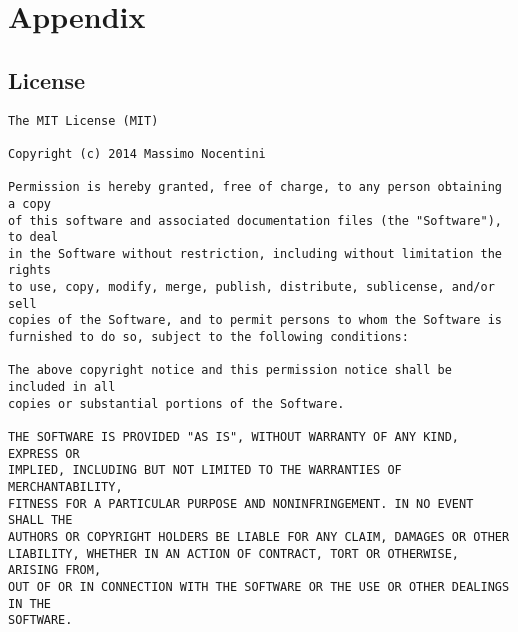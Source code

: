 \documentclass[10pt,a4paper]{article}
\begin{document}
    \newpage

    \section{Appendix}
    \label{sec:appendix}

    \subsection{License}
\begin{verbatim}
The MIT License (MIT)

Copyright (c) 2014 Massimo Nocentini

Permission is hereby granted, free of charge, to any person obtaining a copy
of this software and associated documentation files (the "Software"), to deal
in the Software without restriction, including without limitation the rights
to use, copy, modify, merge, publish, distribute, sublicense, and/or sell
copies of the Software, and to permit persons to whom the Software is
furnished to do so, subject to the following conditions:

The above copyright notice and this permission notice shall be included in all
copies or substantial portions of the Software.

THE SOFTWARE IS PROVIDED "AS IS", WITHOUT WARRANTY OF ANY KIND, EXPRESS OR
IMPLIED, INCLUDING BUT NOT LIMITED TO THE WARRANTIES OF MERCHANTABILITY,
FITNESS FOR A PARTICULAR PURPOSE AND NONINFRINGEMENT. IN NO EVENT SHALL THE
AUTHORS OR COPYRIGHT HOLDERS BE LIABLE FOR ANY CLAIM, DAMAGES OR OTHER
LIABILITY, WHETHER IN AN ACTION OF CONTRACT, TORT OR OTHERWISE, ARISING FROM,
OUT OF OR IN CONNECTION WITH THE SOFTWARE OR THE USE OR OTHER DEALINGS IN THE
SOFTWARE.
\end{verbatim}
\end{document}
